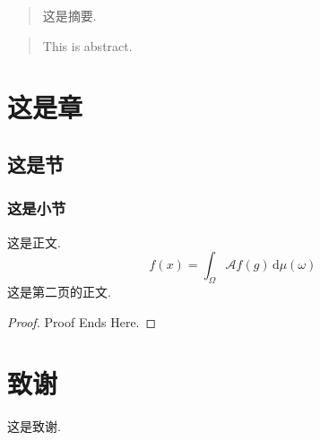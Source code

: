 \documentclass[oneside]{fduthesis2023}
\begin{document}
  \takeCareOfPageNumbers

  \begin{abstract}
    这是摘要.
  \end{abstract}
  
  \changeToEnglishAbstract
  \begin{abstract}
    This is abstract.
  \end{abstract}

  \makeTableOfContents

  \startMainPart
  \chapter{这是章}
    \section{这是节}
      \subsection{这是小节}
        这是正文.
        $$
          f(x)=\int_{\Omega}\mathscr{A}f(g)\,\mathrm{d}\mu(\omega)
        $$
        \newpage
        这是第二页的正文.
        \begin{proof}
          Proof Ends Here.
        \end{proof}

  \backmatter
  \chapter*{致谢}
  \renewcommand{\thepage}{}
    这是致谢.

  \clearpage
\end{document}
